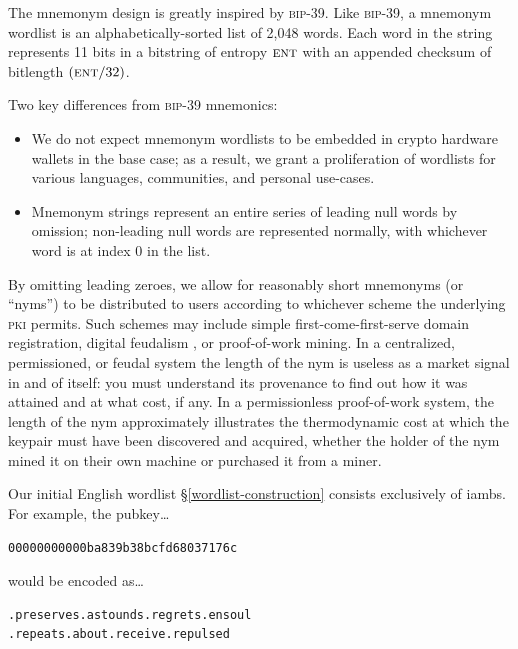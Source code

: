 \documentclass[twoside]{article}
\begin{document}
The mnemonym design is greatly inspired by \textsc{bip}-39. Like
\textsc{bip}-39, a mnemonym wordlist is an alphabetically-sorted list
of 2,048 words. Each word in the string represents 11 bits in a
bitstring of entropy $\textsc{ent}$ with an appended checksum of
bitlength $(\textsc{ent}/32)$.

Two key differences from \textsc{bip}-39 mnemonics:

\begin{itemize}[noitemsep,topsep=2pt]

\item
  We do not expect mnemonym wordlists to be embedded in crypto hardware
  wallets in the base case; as a result, we grant a proliferation of
  wordlists for various languages, communities, and personal
  use-cases.
\item
  Mnemonym strings represent an entire series of leading null words by
  omission; non-leading null words are represented normally, with
  whichever word is at index 0 in the list.
\end{itemize}

By omitting leading zeroes, we allow for reasonably short mnemonyms (or
``nyms'') to be distributed to users according to whichever scheme the
underlying \textsc{pki} permits. Such schemes may include simple
first-come-first-serve domain registration, digital
feudalism \citep{YarvinSpecIntro}, or proof-of-work
mining. In a centralized, permissioned, or feudal system the length
of the nym is useless as a market signal in and of itself: you must
understand its provenance to find out how it was attained and at what cost,
if any. In a permissionless proof-of-work system, the length of the nym
approximately illustrates the thermodynamic cost at which the keypair
must have been discovered and acquired, whether the holder of the nym
mined it on their own machine or purchased it from a miner.

Our initial English wordlist \S\ref{wordlist-construction} consists
exclusively of iambs. For example, the pubkey\ldots{}

\begin{lstlisting}[style=listingblock]
00000000000ba839b38bcfd68037176c
\end{lstlisting}

\noindent
would be encoded as\ldots{}

\begin{lstlisting}[style=listingblock]
.preserves.astounds.regrets.ensoul
.repeats.about.receive.repulsed
\end{lstlisting}
\end{document}
